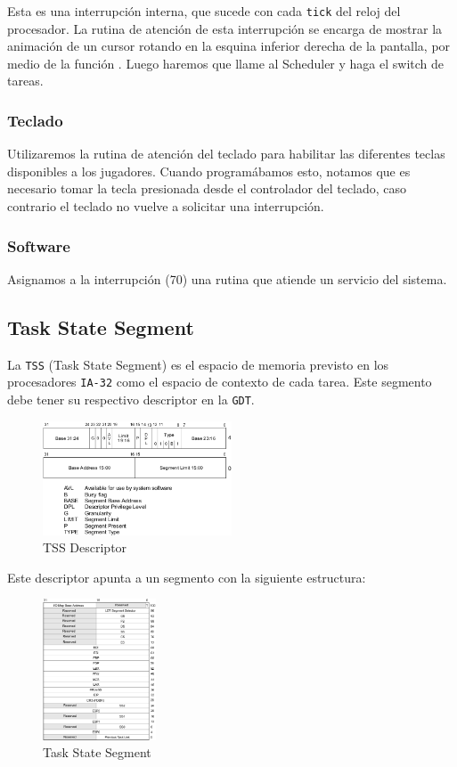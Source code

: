 Esta es una interrupción interna, que sucede con cada \texttt{tick} del reloj del procesador. La rutina de atención de esta interrupción se encarga de mostrar la animación de un cursor rotando en la esquina inferior derecha de la pantalla, por medio de la función . Luego haremos que llame al Scheduler y haga el switch de tareas.

\subsubsection{Teclado}
Utilizaremos la rutina de atención del teclado para habilitar las diferentes teclas disponibles a los jugadores. Cuando programábamos esto, notamos que es necesario tomar la tecla presionada desde el controlador del teclado, caso contrario el teclado no vuelve a solicitar una interrupción.

\subsubsection{Software}
Asignamos a la interrupción  (70) una rutina que atiende un servicio del sistema.

\subsection{Task State Segment}

La \texttt{TSS} (Task State Segment) es el espacio de memoria previsto en los procesadores \texttt{IA-32} como el espacio de contexto de cada tarea. Este segmento debe tener su respectivo descriptor en la \texttt{GDT}. 

\begin{figure}[H]
  \centering
    \includegraphics[width=0.5\textwidth]{images/tss_descriptor}
  \caption{TSS Descriptor}
\end{figure}

Este descriptor apunta a un segmento con la siguiente estructura:

\begin{figure}[H]
  \centering
    \includegraphics[width=0.3\textwidth]{images/tss}
  \caption{Task State Segment}
\end{figure}

